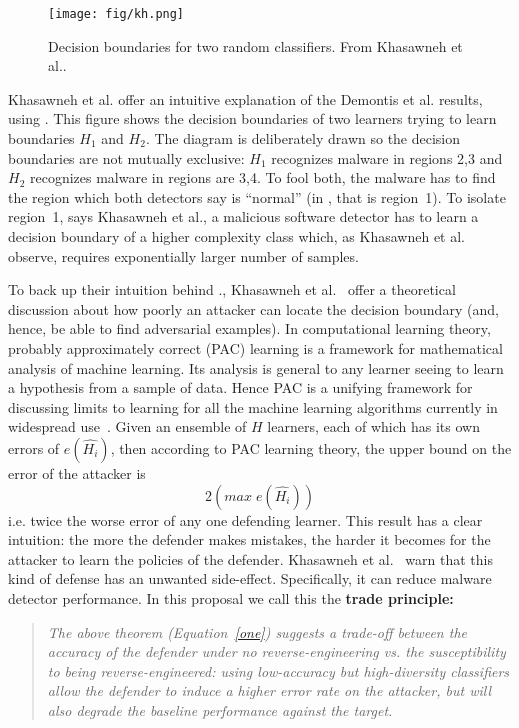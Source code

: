  
 \begin{figure}
\texttt{[image: fig/kh.png]}
\caption{Decision boundaries for two random classifiers. From Khasawneh et al.\cite{khasawneh2017rhmd}.}
\label{fig:kh}
\end{figure} 
Khasawneh et al.\cite{khasawneh2017rhmd} offer an intuitive explanation
of the   Demontis et al. results, using   
.
This figure shows the decision boundaries of two  learners trying to learn boundaries
   $H_1$ and $H_2$. The diagram is deliberately drawn so the     decision boundaries are not mutually exclusive: $H_1$ recognizes  malware in regions   2,3 and $H_2$
  recognizes malware in regions are 3,4. To fool both, the malware has to find the region which both detectors say is ``normal'' (in , that is region~1).
To isolate region~1, says Khasawneh et al.,
  a   malicious software  detector has     to learn a decision boundary of a higher complexity class  which, as  Khasawneh et al. observe,  requires exponentially larger number of samples.

To back up their intuition behind ., Khasawneh et al.~\cite{demontis2019adversarial}  offer a  theoretical discussion
about how poorly  an  attacker can locate    the decision boundary (and, hence, be  able
to find adversarial examples). In computational learning theory, probably approximately correct (PAC) learning is a framework for mathematical analysis of machine learning. Its analysis is general
  to any learner seeing to learn a hypothesis from a sample of data.
  Hence PAC is a unifying framework
  for discussing limits to learning
  for all the machine learning algorithms currently in widespread use~\cite{valiant84}.
  Given an ensemble of $H$ learners, each of which has its own errors of $e(\hat{H_i})$, then according to PAC learning theory, the  upper bound on the error of the attacker is 
\begin{equation}\label{one}
2(\mathit{max}\; e(\hat{H_i}))
\end{equation}
i.e. twice the worse error of any one defending learner. This result has a clear intuition: the more the defender makes mistakes, the harder it becomes for the attacker to learn the policies of the defender.  Khasawneh et al.~\cite{demontis2019adversarial} warn that    this kind of defense has an unwanted side-effect. Specifically, it can reduce malware detector performance.
In this proposal we call this the {\bf trade principle:}
\begin{quote}
{\em The above theorem (Equation~\ref{one}) suggests a trade-off between the accuracy of the defender under no reverse-engineering vs. the susceptibility to being reverse-engineered: using low-accuracy but high-diversity classifiers allow the defender to induce a higher error rate on the attacker, but will also degrade the baseline performance against the target. }
\end{quote}
 
